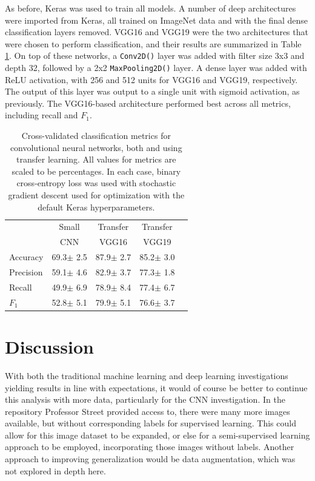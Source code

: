 \documentclass{article}
\begin{document}
	As before, Keras was used to train all models. A number of deep architectures were imported from Keras, all trained on ImageNet data and with the final dense classification layers removed. VGG16 and VGG19 were the two architectures that were chosen to perform classification, and their results are summarized in Table \ref{CNN-table}. On top of these networks, a \texttt{Conv2D()} layer was added with filter size 3x3 and depth 32, followed by a 2x2 \texttt{MaxPooling2D()} layer. A dense layer was added with ReLU activation, with 256 and 512 units for VGG16 and VGG19, respectively. The output of this layer was output to a single unit with sigmoid activation, as previously. The VGG16-based architecture performed best across all metrics, including recall and $F_1$.
	
		\begin{table}[t]
		\caption{Cross-validated classification metrics for convolutional neural networks, both and using transfer learning. All values for metrics are scaled to be percentages. In each case, binary cross-entropy loss was used with stochastic gradient descent used for optimization with the default Keras hyperparameters.}
		\label{CNN-table}
		\vskip 0.15in
		\begin{center}
			\begin{small}
				\begin{sc}
					\begin{tabular}{lcccr}
						\toprule
						& Small & Transfer & Transfer \\
						&CNN&VGG16&VGG19\\
						\midrule
						Accuracy    & 69.3$\pm$ 2.5& 87.9$\pm$ 2.7& 85.2$\pm$ 3.0\\
						Precision 	& 59.1$\pm$ 4.6& 82.9$\pm$ 3.7& 77.3$\pm$ 1.8\\
						Recall    	& 49.9$\pm$ 6.9& 78.9$\pm$ 8.4& 77.4$\pm$ 6.7\\
						$F_{1}$    	& 52.8$\pm$ 5.1& 79.9$\pm$ 5.1& 76.6$\pm$ 3.7\\
						\bottomrule
					\end{tabular}
				\end{sc}
			\end{small}
		\end{center}
		\vskip -0.1in
	\end{table}
	
	
	\section{Discussion}
	With both the traditional machine learning and deep learning investigations yielding results in line with expectations, it would of course be better to continue this analysis with more data, particularly for the CNN investigation. In the repository Professor Street provided access to, there were many more images available, but without corresponding labels for supervised learning. This could allow for this image dataset to be expanded, or else for a semi-supervised learning approach to be employed, incorporating those images without labels. Another approach to improving generalization would be data augmentation, which was not explored in depth here.
	
\end{document}
